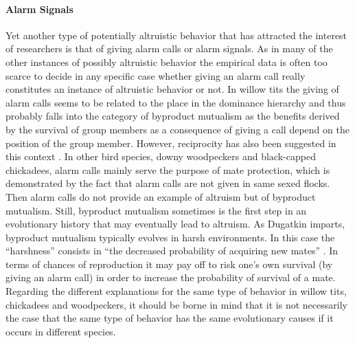 \paragraph{Alarm Signals}

Yet another type of potentially altruistic behavior that has attracted the
interest of researchers is that of giving alarm calls or alarm signals. As in
many of the other instances of possibly altruistic behavior the empirical
data is often too scarce to decide in any specific case whether giving an alarm
call really constitutes an instance of altruistic behavior or not. In willow
tits the giving of alarm calls seems to be related to the place in the
dominance hierarchy and thus probably falls into the category of byproduct
mutualism as the benefits derived by the survival of group members as a
consequence of giving a call depend on the position of the group member.
However, reciprocity has also been suggested in this context \cite[p.\ 
86]{dugatkin:1997}. In other bird species, downy woodpeckers and black-capped
chickadees, alarm calls mainly serve the purpose of mate protection, which is
demonstrated by the fact that alarm calls are not given in same sexed flocks.
Then alarm calls do not provide an example of altruism but of byproduct
mutualism. Still, byproduct mutualism sometimes is the first step in an
evolutionary history that may eventually lead to altruism. As Dugatkin
imparts, byproduct mutualism typically evolves in
harsh environments. In this case the ``harshness'' consists in ``the decreased
probability of acquiring new mates'' \cite[p.\ 86]{dugatkin:1997}. In terms of
chances of reproduction it may pay off to risk one's own survival (by giving
an alarm call) in order to increase the probability of survival of a mate.
Regarding the different explanations for the same type of behavior in willow
tits, chickadees and woodpeckers, it should be borne in mind that it is not
necessarily the case that the same type of behavior has the same evolutionary
causes if it occurs in different species.

